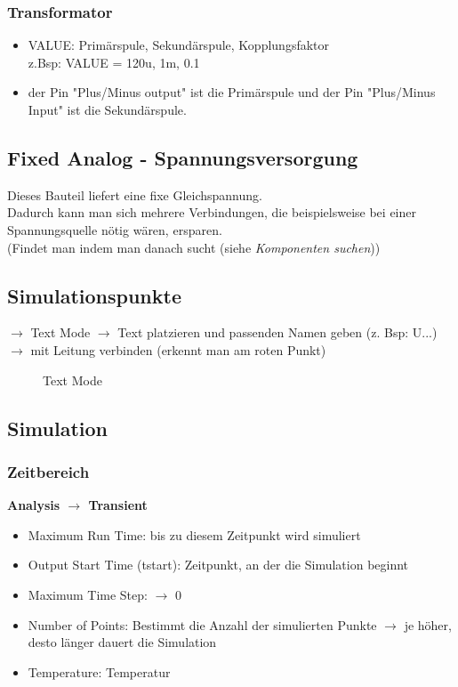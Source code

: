 \subsubsection*{Transformator}

\begin{itemize}
    \item VALUE: Primärspule, Sekundärspule, Kopplungsfaktor\\
    z.Bsp: VALUE = 120u, 1m, 0.1
    \item der Pin "Plus/Minus output" ist die Primärspule und der Pin "Plus/Minus Input" ist die Sekundärspule.
\end{itemize}

\subsection{Fixed Analog - Spannungsversorgung}
Dieses Bauteil liefert eine fixe Gleichspannung.\\
Dadurch kann man sich mehrere Verbindungen, die beispielsweise bei einer Spannungsquelle nötig wären, ersparen.\\
(Findet man indem man danach sucht (siehe \textit{Komponenten suchen}))

\newpage

\subsection{Simulationspunkte}
$\rightarrow$ Text Mode $\rightarrow$ Text platzieren und passenden Namen geben (z. Bsp: U...) $\rightarrow$ mit Leitung verbinden (erkennt man am roten Punkt)

\begin{figure}[h]
    \centering
    \caption{Text Mode}
    \label{fig:Text Mode}
\end{figure}

\newpage

\subsection{Simulation}

\subsubsection*{Zeitbereich}
\textbf{Analysis $\rightarrow$ Transient}

\begin{itemize}
    \item Maximum Run Time: bis zu diesem Zeitpunkt wird simuliert
    \item Output Start Time (tstart): Zeitpunkt, an der die Simulation beginnt
    \item Maximum Time Step: $\rightarrow$ 0
    \item Number of Points: Bestimmt die Anzahl der simulierten Punkte $\rightarrow$ je höher, desto länger dauert die Simulation
    \item Temperature: Temperatur
\end{itemize}


